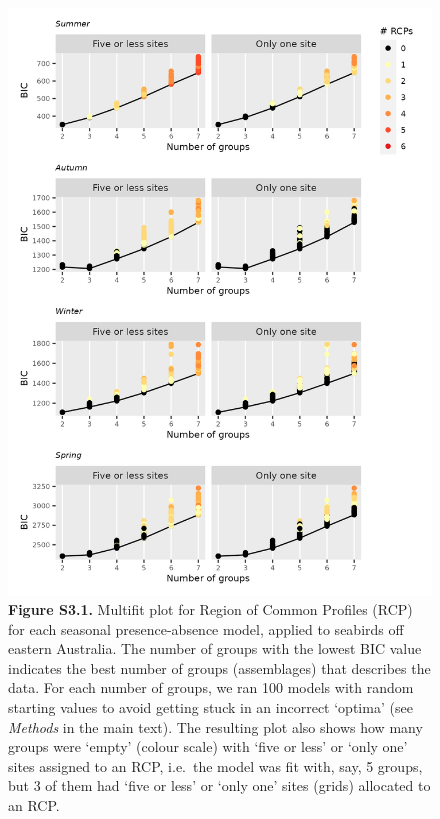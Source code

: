 \documentclass[
]{article}
\begin{document}
\begin{figure}
\centering
\includegraphics{../results/FigS3_1_multifit-Bernoulli.png}
\caption{\textbf{Figure S3.1.} Multifit plot for Region of Common
Profiles (RCP) for each seasonal presence-absence model, applied to
seabirds off eastern Australia. The number of groups with the lowest BIC
value indicates the best number of groups (assemblages) that describes
the data. For each number of groups, we ran 100 models with random
starting values to avoid getting stuck in an incorrect `optima' (see
\emph{Methods} in the main text). The resulting plot also shows how many
groups were `empty' (colour scale) with `five or less' or `only one'
sites assigned to an RCP, i.e.~the model was fit with, say, 5 groups,
but 3 of them had `five or less' or `only one' sites (grids) allocated
to an RCP.}
\end{figure}

\newpage
\end{document}
